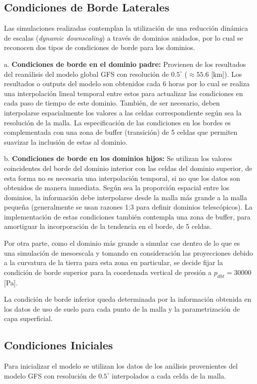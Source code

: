 \subsection{Condiciones de Borde Laterales}
Las simulaciones realizadas contemplan la utilización de una reducción dinámica de escalas (\emph{dynamic downscaling}) a través de dominios anidados, por lo cual se reconocen dos tipos de condiciones de borde para los dominios.
\begin{enumerate*}
	\item[a.] \textbf{Condiciones de borde en el dominio padre:} Provienen de los resultados del reanálisis del modelo global GFS con resolución de $0.5^\circ$ ($\approx 55.6$ [km]). Los resultados o outputs del modelo son obtenidos cada 6 horas por lo cual se realiza una interpolación lineal temporal entre estos para actualizar las condiciones en cada paso de tiempo de este dominio. También, de ser necesario, deben interpolarse espacialmente los valores a las celdas correspondiente según sea la resolución de la malla. La especificación de las condiciones en los bordes es complementada con una zona de buffer (transición) de 5 celdas que permiten suavizar la inclusión de estas al dominio.
	\item[b.] \textbf{Condiciones de borde en los dominios hijos:} Se utilizan los valores coincidentes del borde del dominio interior con las celdas del dominio superior, de esta forma no es necesaria una interpolación temporal, si no que los datos son obtenidos de manera inmediata. Según sea la proporción espacial entre los dominios, la información debe interpolarse desde la malla más grande a la malla pequeña (generalmente se usan razones 1:3 para definir dominios telescópicos). La implementación de estas condiciones también contempla una zona de buffer, para amortiguar la incorporación de la tendencia en el borde, de 5 celdas.
\end{enumerate*}
Por otra parte, como el dominio más grande a simular cae dentro de lo que es una simulación de mesoescala y tomando en consideración las proyecciones debido a la curvatura de la tierra para esta zona en particular, se decide fijar la condición de borde superior para la coordenada vertical de presión a $p_{dht} = 30000$ [Pa].

La condición de borde inferior queda determinada por la información obtenida en los datos de uso de suelo para cada punto de la malla y la parametrización de capa superficial.
\subsection{Condiciones Iniciales}
Para inicializar el modelo se utilizan los datos de los análisis  provenientes del modelo  GFS con resolución de $0.5^\circ$ interpolados a cada celda de la malla.

